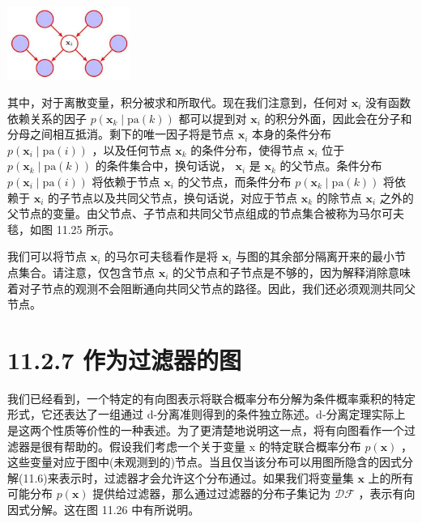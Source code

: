\documentclass[10pt]{article}
\begin{document}
\begin{center}
\includegraphics[max width=0.3\textwidth]{images/0194e279-9b28-703a-88f4-c3ac21e2010d_367_1097_343_458_274_0.jpg}
\end{center}
\hspace*{3em} 

其中，对于离散变量，积分被求和所取代。现在我们注意到，任何对 \({\mathbf{x}}_{i}\) 没有函数依赖关系的因子 \(p\left( {{\mathbf{x}}_{k} \mid  \mathrm{{pa}}\left( k\right) }\right)\) 都可以提到对 \({\mathbf{x}}_{i}\) 的积分外面，因此会在分子和分母之间相互抵消。剩下的唯一因子将是节点 \({\mathbf{x}}_{i}\) 本身的条件分布 \(p\left( {{\mathbf{x}}_{i} \mid  \mathrm{{pa}}\left( i\right) }\right)\) ，以及任何节点 \({\mathbf{x}}_{k}\) 的条件分布，使得节点 \({\mathbf{x}}_{i}\) 位于 \(p\left( {{\mathbf{x}}_{k} \mid  \mathrm{{pa}}\left( k\right) }\right)\) 的条件集合中，换句话说， \({\mathbf{x}}_{i}\) 是 \({\mathbf{x}}_{k}\) 的父节点。条件分布 \(p\left( {{\mathbf{x}}_{i} \mid  \mathrm{{pa}}\left( i\right) }\right)\) 将依赖于节点 \({\mathbf{x}}_{i}\) 的父节点，而条件分布 \(p\left( {{\mathbf{x}}_{k} \mid  \mathrm{{pa}}\left( k\right) }\right)\) 将依赖于 \({\mathbf{x}}_{i}\) 的子节点以及共同父节点，换句话说，对应于节点 \({\mathbf{x}}_{k}\) 的除节点 \({\mathbf{x}}_{i}\) 之外的父节点的变量。由父节点、子节点和共同父节点组成的节点集合被称为马尔可夫毯，如图 11.25 所示。

我们可以将节点 \({\mathbf{x}}_{i}\) 的马尔可夫毯看作是将 \({\mathbf{x}}_{i}\) 与图的其余部分隔离开来的最小节点集合。请注意，仅包含节点 \({\mathbf{x}}_{i}\) 的父节点和子节点是不够的，因为解释消除意味着对子节点的观测不会阻断通向共同父节点的路径。因此，我们还必须观测共同父节点。

\section*{11.2.7 作为过滤器的图}

我们已经看到，一个特定的有向图表示将联合概率分布分解为条件概率乘积的特定形式，它还表达了一组通过 d-分离准则得到的条件独立陈述。d-分离定理实际上是这两个性质等价性的一种表述。为了更清楚地说明这一点，将有向图看作一个过滤器是很有帮助的。假设我们考虑一个关于变量 \(\mathrm{x}\) 的特定联合概率分布 \(p\left( \mathbf{x}\right)\) ，这些变量对应于图中(未观测到的)节点。当且仅当该分布可以用图所隐含的因式分解(11.6)来表示时，过滤器才会允许这个分布通过。如果我们将变量集 \(\mathbf{x}\) 上的所有可能分布 \(p\left( \mathbf{x}\right)\) 提供给过滤器，那么通过过滤器的分布子集记为 \(\mathcal{D}\mathcal{F}\) ，表示有向因式分解。这在图 11.26 中有所说明。
\end{document}
